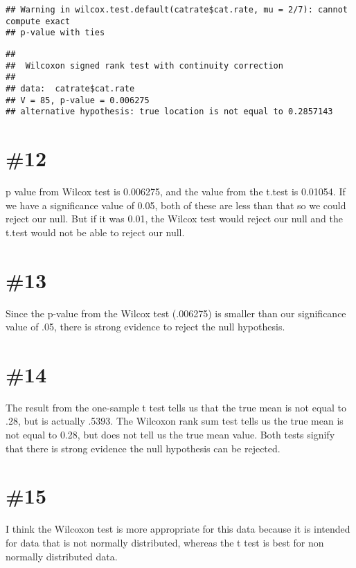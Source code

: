 \documentclass[
]{article}
\begin{document}
\begin{verbatim}
## Warning in wilcox.test.default(catrate$cat.rate, mu = 2/7): cannot compute exact
## p-value with ties
\end{verbatim}

\begin{verbatim}
## 
##  Wilcoxon signed rank test with continuity correction
## 
## data:  catrate$cat.rate
## V = 85, p-value = 0.006275
## alternative hypothesis: true location is not equal to 0.2857143
\end{verbatim}

\hypertarget{section-11}{%
\section{\#12}\label{section-11}}

p value from Wilcox test is 0.006275, and the value from the t.test is
0.01054. If we have a significance value of 0.05, both of these are less
than that so we could reject our null. But if it was 0.01, the Wilcox
test would reject our null and the t.test would not be able to reject
our null.

\hypertarget{section-12}{%
\section{\#13}\label{section-12}}

Since the p-value from the Wilcox test (.006275) is smaller than our
significance value of .05, there is strong evidence to reject the null
hypothesis.

\hypertarget{section-13}{%
\section{\#14}\label{section-13}}

The result from the one-sample t test tells us that the true mean is not
equal to .28, but is actually .5393. The Wilcoxon rank sum test tells us
the true mean is not equal to 0.28, but does not tell us the true mean
value. Both tests signify that there is strong evidence the null
hypothesis can be rejected.

\hypertarget{section-14}{%
\section{\#15}\label{section-14}}

I think the Wilcoxon test is more appropriate for this data because it
is intended for data that is not normally distributed, whereas the t
test is best for non normally distributed data.
\end{document}
